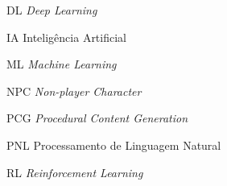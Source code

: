 \begin{siglas}
 \item[DL] \textit{Deep Learning}
 \item[IA] Inteligência Artificial
 \item[ML] \textit{Machine Learning}
 \item[NPC] \textit{Non-player Character}
 \item[PCG] \textit{Procedural Content Generation}
 \item[PNL] Processamento de Linguagem Natural
 \item[RL] \textit{Reinforcement Learning}
\end{siglas}
